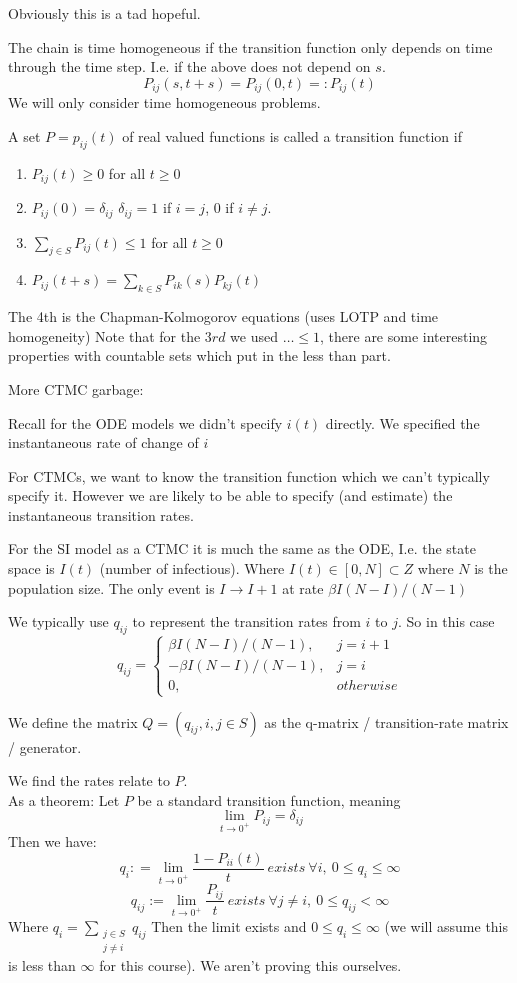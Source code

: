 \documentclass{X:/Documents/Coding/Latex/myassignment}
\begin{document}
Obviously this is a tad hopeful.

The chain is time homogeneous if the transition function only depends on time through the time step. I.e. if the above does not depend on $s$.
\[P_{ij}(s,t+s) = P_{ij}(0,t) =: P_{ij}(t)\]
We will only consider time homogeneous problems.

A set $P= p_{ij}(t)$ of real valued functions is called a transition function if
\begin{enumerate}
    \item $P_{ij}(t) \geq 0$ for all $t\geq 0$
    \item $P_{ij}(0) = \delta_{ij}$ $\delta_{ij} =1$ if $i=j$, $0$ if $i\neq j$.
    \item $\sum_{j\in S} P_{ij}(t) \leq 1$ for all $t\geq 0$
    \item $P_{ij}(t+s) = \sum_{k\in S} P_{ik}(s) P_{kj}(t)$
\end{enumerate}
The 4th is the Chapman-Kolmogorov equations (uses LOTP and time homogeneity)
Note that for the $3rd$ we used $\hdots \leq 1$, there are some interesting properties with countable sets which put in the less than part. 


More CTMC garbage:

Recall for the ODE models we didn't specify $i(t)$ directly. We specified the instantaneous rate of change of $i$


For CTMCs, we want to know the transition function which we can't typically specify it. However we are likely to be able to specify (and estimate) the instantaneous transition rates.

For the SI model as a CTMC it is much the same as the ODE, I.e. the state space is $I(t)$ (number of infectious). Where $I(t) \in [0,N] \subset Z$ where $N$ is the population size.
The only event is $I\to I+1$ at rate $\beta I(N-I)/(N-1)$


We typically use $q_{ij}$ to represent the transition rates from $i$ to $j$. So in this case
\[q_{ij} = \begin{cases}
\beta I(N-I)/(N-1), & j=i+1\\
-\beta I(N-I)/(N-1), & j=i\\
0, & otherwise
\end{cases}\]


We define the matrix $Q = (q_{ij}, i,j \in S)$ as the q-matrix / transition-rate matrix / generator. 

We find the rates relate to $P$. \\
As a theorem: Let $P$ be a standard transition function, meaning
\[\lim_{t\to 0^+} P_{ij} = \delta_{ij}\]
Then we have:
\[q_{i} : = \lim_{t \to 0^+} \frac{1-P_{ii}(t)}t\ exists \ \forall i,\ 0\leq q_i \leq \infty\]
\[q_{ij} := \lim_{t\to 0^+} \frac{P_{ij}}t\ exists\ \forall j\neq i,\ 0\leq q_{ij} < \infty\]
Where $q_{i} = \sum_{\substack{j\in S\\j\neq i}} q_{ij}$
Then the limit exists and $0\leq q_i \leq \infty$ (we will assume this is less than $\infty$ for this course).
We aren't proving this ourselves.
\end{document}
